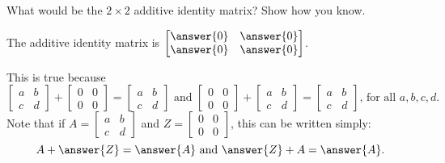 \documentclass[space,nooutcomes]{ximera}
\begin{document}
\begin{question}
What would be the $2\times 2$ additive identity matrix?  Show how you
know.
\begin{solution}
The additive identity matrix is $\begin{bmatrix} \answer{0}&\answer{0} \\ \answer{0}&\answer{0} \end{bmatrix}$.  

\begin{question}
This is true because 
\[
\begin{bmatrix} a&b \\ c&d \end{bmatrix} + \begin{bmatrix} 0&0 \\ 0&0 \end{bmatrix} = 
\begin{bmatrix} a&b \\ c&d \end{bmatrix}
\text{ and }
\begin{bmatrix} 0&0 \\ 0&0 \end{bmatrix} + \begin{bmatrix} a&b \\ c&d \end{bmatrix} = 
\begin{bmatrix} a&b \\ c&d \end{bmatrix}\text{, for all }a, b, c, d.  
\]
Note that if $A = \begin{bmatrix} a&b \\ c&d \end{bmatrix}$ and $Z = \begin{bmatrix} 0&0 \\ 0&0 \end{bmatrix}$, this can be written simply:  
\[
A + \answer{Z} = \answer{A}\text{ and }\answer{Z}+A = \answer{A}.
\]
\end{question}
\end{solution}
\end{question}
\end{document}
